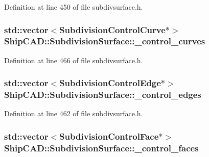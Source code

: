 Definition at line 450 of file subdivsurface.\+h.

\subsubsection[{\texorpdfstring{\+\_\+control\+\_\+curves}{_control_curves}}]{\setlength{\rightskip}{0pt plus 5cm}std\+::vector$<${\bf Subdivision\+Control\+Curve}$\ast$$>$ Ship\+C\+A\+D\+::\+Subdivision\+Surface\+::\+\_\+control\+\_\+curves\hspace{0.3cm}{\ttfamily [protected]}}\hypertarget{classShipCAD_1_1SubdivisionSurface_a72da0f8a60e186e10b88f48950a490e9}{}\label{classShipCAD_1_1SubdivisionSurface_a72da0f8a60e186e10b88f48950a490e9}


Definition at line 466 of file subdivsurface.\+h.

\subsubsection[{\texorpdfstring{\+\_\+control\+\_\+edges}{_control_edges}}]{\setlength{\rightskip}{0pt plus 5cm}std\+::vector$<${\bf Subdivision\+Control\+Edge}$\ast$$>$ Ship\+C\+A\+D\+::\+Subdivision\+Surface\+::\+\_\+control\+\_\+edges\hspace{0.3cm}{\ttfamily [protected]}}\hypertarget{classShipCAD_1_1SubdivisionSurface_ac6b2950f05e07f5a7814b278a9dc1513}{}\label{classShipCAD_1_1SubdivisionSurface_ac6b2950f05e07f5a7814b278a9dc1513}


Definition at line 462 of file subdivsurface.\+h.

\subsubsection[{\texorpdfstring{\+\_\+control\+\_\+faces}{_control_faces}}]{\setlength{\rightskip}{0pt plus 5cm}std\+::vector$<${\bf Subdivision\+Control\+Face}$\ast$$>$ Ship\+C\+A\+D\+::\+Subdivision\+Surface\+::\+\_\+control\+\_\+faces\hspace{0.3cm}{\ttfamily [protected]}}\hypertarget{classShipCAD_1_1SubdivisionSurface_a69c240904f61f8181a57559d4fa548c0}{}\label{classShipCAD_1_1SubdivisionSurface_a69c240904f61f8181a57559d4fa548c0}


